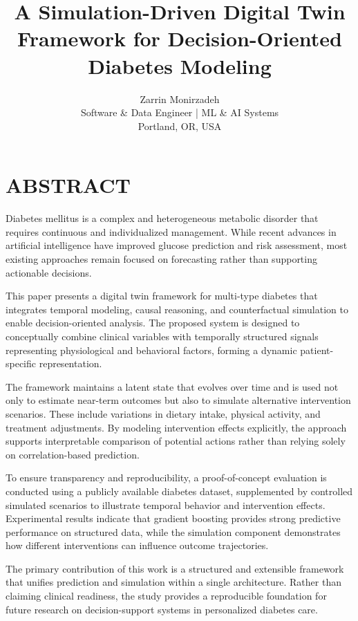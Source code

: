 \documentclass[journal]{IEEEtran}
\begin{document}
\title{\LARGE \bfseries
A Simulation-Driven Digital Twin Framework for Decision-Oriented Diabetes Modeling
}
\author{
\Large Zarrin Monirzadeh\\[0.6em]
\normalsize Software \& Data Engineer | ML \& AI Systems\\
\normalsize Portland, OR, USA
}
\maketitle

\section*{\centering ABSTRACT}
\noindent
Diabetes mellitus is a complex and heterogeneous metabolic disorder that requires continuous and individualized management. While recent advances in artificial intelligence have improved glucose prediction and risk assessment, most existing approaches remain focused on forecasting rather than supporting actionable decisions.

This paper presents a digital twin framework for multi-type diabetes that integrates temporal modeling, causal reasoning, and counterfactual simulation to enable decision-oriented analysis. The proposed system is designed to conceptually combine clinical variables with temporally structured signals representing physiological and behavioral factors, forming a dynamic patient-specific representation.

The framework maintains a latent state that evolves over time and is used not only to estimate near-term outcomes but also to simulate alternative intervention scenarios. These include variations in dietary intake, physical activity, and treatment adjustments. By modeling intervention effects explicitly, the approach supports interpretable comparison of potential actions rather than relying solely on correlation-based prediction.

To ensure transparency and reproducibility, a proof-of-concept evaluation is conducted using a publicly available diabetes dataset, supplemented by controlled simulated scenarios to illustrate temporal behavior and intervention effects. Experimental results indicate that gradient boosting provides strong predictive performance on structured data, while the simulation component demonstrates how different interventions can influence outcome trajectories.

The primary contribution of this work is a structured and extensible framework that unifies prediction and simulation within a single architecture. Rather than claiming clinical readiness, the study provides a reproducible foundation for future research on decision-support systems in personalized diabetes care.
\end{document}
